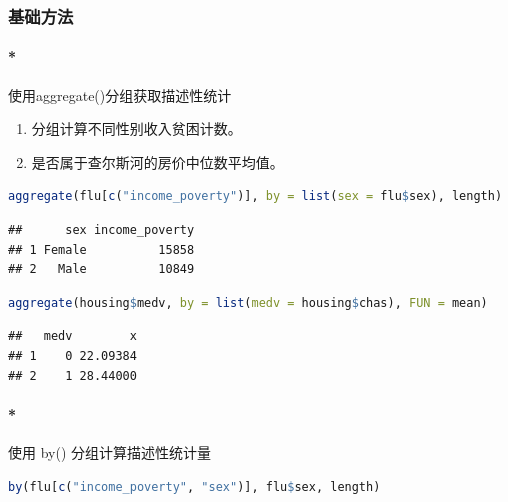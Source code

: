 \documentclass[]{ctexbook}
\providecommand{\tightlist}{%
  \setlength{\itemsep}{0pt}\setlength{\parskip}{0pt}}
\let\oldparagraph\paragraph
\renewcommand{\paragraph}[1]{\oldparagraph{#1}\mbox{}}
\begin{document}
\hypertarget{ux57faux7840ux65b9ux6cd5-1}{%
\subsubsection{基础方法}\label{ux57faux7840ux65b9ux6cd5-1}}

\hypertarget{ux4f7fux7528aggregateux5206ux7ec4ux83b7ux53d6ux63cfux8ff0ux6027ux7edfux8ba1}{%
\paragraph*{使用aggregate()分组获取描述性统计}\label{ux4f7fux7528aggregateux5206ux7ec4ux83b7ux53d6ux63cfux8ff0ux6027ux7edfux8ba1}}

\begin{enumerate}
\def\labelenumi{\arabic{enumi}.}
\tightlist
\item
  分组计算不同性别收入贫困计数。
\item
  是否属于查尔斯河的房价中位数平均值。
\end{enumerate}

\begin{lstlisting}[language=R]
aggregate(flu[c("income_poverty")], by = list(sex = flu$sex), length)
\end{lstlisting}

\begin{lstlisting}
##      sex income_poverty
## 1 Female          15858
## 2   Male          10849
\end{lstlisting}

\begin{lstlisting}[language=R]
aggregate(housing$medv, by = list(medv = housing$chas), FUN = mean)
\end{lstlisting}

\begin{lstlisting}
##   medv        x
## 1    0 22.09384
## 2    1 28.44000
\end{lstlisting}

\hypertarget{ux4f7fux7528-by-ux5206ux7ec4ux8ba1ux7b97ux63cfux8ff0ux6027ux7edfux8ba1ux91cf}{%
\paragraph*{使用 by() 分组计算描述性统计量}\label{ux4f7fux7528-by-ux5206ux7ec4ux8ba1ux7b97ux63cfux8ff0ux6027ux7edfux8ba1ux91cf}}

\begin{lstlisting}[language=R]
by(flu[c("income_poverty", "sex")], flu$sex, length)
\end{lstlisting}
\end{document}
